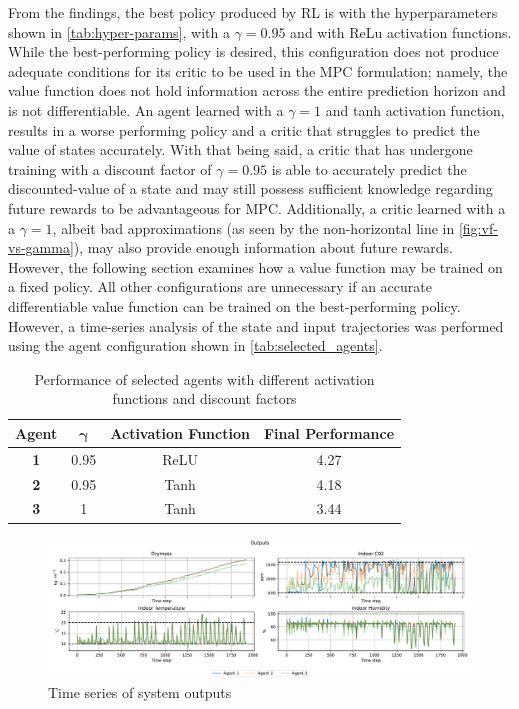 From the findings, the best policy produced by RL is with the hyperparameters shown in \autoref{tab:hyper-params}, with a $\gamma = 0.95$  and with ReLu activation functions. While the best-performing policy is desired, this configuration does not produce adequate conditions for its critic to be used in the MPC formulation; namely, the value function does not hold information across the entire prediction horizon and is not differentiable. An agent learned with a $\gamma = 1$ and tanh activation function, results in a worse performing policy and a critic that struggles to predict the value of states accurately. With that being said, a critic that has undergone training with a discount factor of $\gamma = 0.95$ is able to accurately predict the discounted-value of a state and may still possess sufficient knowledge regarding future rewards to be advantageous for MPC. Additionally, a critic learned with a a $\gamma = 1$, albeit bad approximations (as seen by the non-horizontal line in \autoref{fig:vf-vs-gamma}), may also provide enough information about future rewards. However, the following section examines how a value function may be trained on a fixed policy. All other configurations are unnecessary if an accurate differentiable value function can be trained on the best-performing policy. However, a time-series analysis of the state and input trajectories was performed using the agent configuration shown in \autoref{tab:selected_agents}.

\begin{table}[h!]
	\centering
	\begin{tabular}{c c c c}
		\toprule
		\textbf{Agent} & $\boldsymbol{\gamma}$ & \textbf{Activation Function} & \textbf{Final Performance} \\
		\midrule
		\textbf{ 1} & 0.95 & ReLU & 4.27 \\
		\textbf{ 2} & 0.95 & Tanh & 4.18 \\
		\textbf{ 3} & 1 & Tanh & 3.44 \\
		\bottomrule
	\end{tabular}
	\caption{Performance of selected agents with different activation functions and discount factors}
	\label{tab:selected_agents}
\end{table}

\begin{figure}[H]
    \centering
    \includegraphics[width = \textwidth]{figures/selected_policies_outputs.pdf}
    \caption{Time series of system outputs}
    \label{fig:selected-policies-outputs}
\end{figure}

